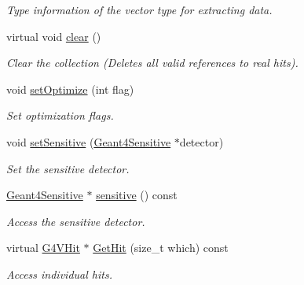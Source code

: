\begin{DoxyCompactItemize}
\begin{DoxyCompactList}\small\item\em Type information of the vector type for extracting data. \item\end{DoxyCompactList}\item 
virtual void \hyperlink{class_d_d4hep_1_1_simulation_1_1_geant4_hit_collection_a02e7c1123e909477f4b7951e94c10768}{clear} ()
\begin{DoxyCompactList}\small\item\em Clear the collection (Deletes all valid references to real hits). \item\end{DoxyCompactList}\item 
void \hyperlink{class_d_d4hep_1_1_simulation_1_1_geant4_hit_collection_a163e9842ded780e1f39dbe6701c132d8}{setOptimize} (int flag)
\begin{DoxyCompactList}\small\item\em Set optimization flags. \item\end{DoxyCompactList}\item 
void \hyperlink{class_d_d4hep_1_1_simulation_1_1_geant4_hit_collection_a5d4547aa0f97d5ef2391986f634806d5}{setSensitive} (\hyperlink{class_d_d4hep_1_1_simulation_1_1_geant4_sensitive}{Geant4Sensitive} $\ast$detector)
\begin{DoxyCompactList}\small\item\em Set the sensitive detector. \item\end{DoxyCompactList}\item 
\hyperlink{class_d_d4hep_1_1_simulation_1_1_geant4_sensitive}{Geant4Sensitive} $\ast$ \hyperlink{class_d_d4hep_1_1_simulation_1_1_geant4_hit_collection_ad0913228818c6f091502597a00267725}{sensitive} () const 
\begin{DoxyCompactList}\small\item\em Access the sensitive detector. \item\end{DoxyCompactList}\item 
virtual \hyperlink{class_g4_v_hit}{G4VHit} $\ast$ \hyperlink{class_d_d4hep_1_1_simulation_1_1_geant4_hit_collection_a43c7326636e5b90a2b114d0fb0696c83}{GetHit} (size\_\-t which) const 
\begin{DoxyCompactList}\small\item\em Access individual hits. \item\end{DoxyCompactList}\item 

\end{DoxyCompactItemize}
